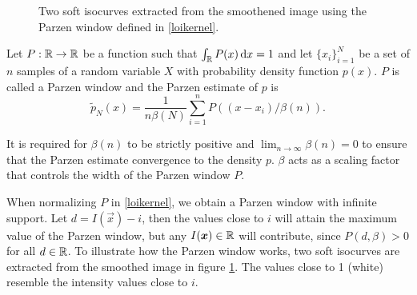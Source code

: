 \begin{figure}
  \centering
  \quad
  \caption{Two soft isocurves extracted from the smoothened image using the Parzen window defined in \eqref{loikernel}.}\label{fig:SoftIso}
\end{figure}
\begin{definition}\label{parzen}
Let $P:\mathbb R\to \mathbb R$ be a function such that $\int_\mathbb R P(x) \,{\rm d} x= 1$ and let $\{x_i\}_{i=1}^N$ be a set of $n$ samples of a random variable $X$ with probability density function $p(x)$. $P$ is called a Parzen window and the Parzen estimate of $p$ is 
\begin{equation}
\tilde{p}_N(x) = \frac{1}{n\beta(N)}\sum_{i=1}^n P((x-x_i)/\beta(n)).
\end{equation}

It is required for $\beta(n)$ to be strictly positive and $\lim_{n\to\infty}\beta(n) = 0$ to ensure that the Parzen estimate convergence to the density $p$. $\beta$ acts as a scaling factor that controls the width of the Parzen window $P$. \cite{the.00,parzen.62}
\end{definition}

When normalizing $P$ in \eqref{loikernel}, we obtain a Parzen window with infinite support. Let $d=I(\vec{x})-i$, then the values close to $i$ will attain the maximum value of the Parzen window, but any $I(\boldsymbol{x} )\in \mathbb R$ will contribute, since $P(d,\beta)>0$ for all $d\in\mathbb R$. To illustrate how the Parzen window works, two soft isocurves are extracted from the smoothed image in figure \ref{fig:SoftIso}. The values close to 1 (white) resemble the intensity values close to $i$.\\

